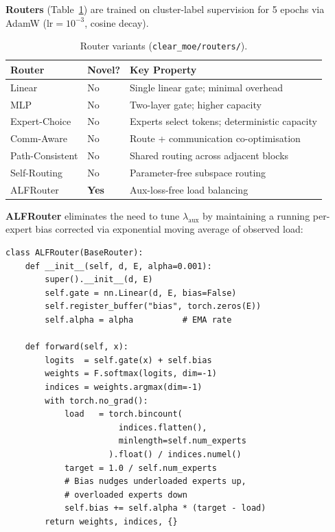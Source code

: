 \documentclass[conference]{IEEEtran}
\begin{document}
\textbf{Routers} (Table~\ref{tab:routers}) are trained on cluster-label
supervision for 5 epochs via AdamW ($\text{lr}{=}10^{-3}$, cosine decay).

\begin{table}[htbp]
\caption{Router variants (\texttt{clear\_moe/routers/}).}
\label{tab:routers}
\centering
\scriptsize
\begin{tabular}{llp{2.1cm}}
\toprule
\textbf{Router} & \textbf{Novel?} & \textbf{Key Property} \\
\midrule
Linear          & No  & Single linear gate; minimal overhead \\
MLP             & No  & Two-layer gate; higher capacity \\
Expert-Choice   & No  & Experts select tokens; deterministic capacity \\
Comm-Aware      & No  & Route + communication co-optimisation \\
Path-Consistent & No  & Shared routing across adjacent blocks \\
Self-Routing    & No  & Parameter-free subspace routing \\
ALFRouter       & \textbf{Yes} & Aux-loss-free load balancing \\
\bottomrule
\end{tabular}
\end{table}

\textbf{ALFRouter} eliminates the need to tune $\lambda_\text{aux}$ by
maintaining a running per-expert bias corrected via exponential moving
average of observed load:

\begin{lstlisting}[caption={ALFRouter: auxiliary-loss-free routing
(\texttt{clear\_moe/routers/alf\_router.py}).},label={lst:alf}]
class ALFRouter(BaseRouter):
    def __init__(self, d, E, alpha=0.001):
        super().__init__(d, E)
        self.gate = nn.Linear(d, E, bias=False)
        self.register_buffer("bias", torch.zeros(E))
        self.alpha = alpha          # EMA rate

    def forward(self, x):
        logits  = self.gate(x) + self.bias
        weights = F.softmax(logits, dim=-1)
        indices = weights.argmax(dim=-1)
        with torch.no_grad():
            load   = torch.bincount(
                       indices.flatten(),
                       minlength=self.num_experts
                     ).float() / indices.numel()
            target = 1.0 / self.num_experts
            # Bias nudges underloaded experts up,
            # overloaded experts down
            self.bias += self.alpha * (target - load)
        return weights, indices, {}
\end{lstlisting}
\end{document}

